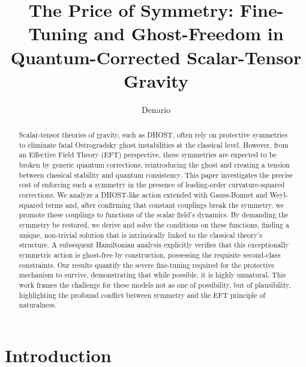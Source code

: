 \documentclass[twocolumn]{aastex631}
\begin{document}
\title{The Price of Symmetry: Fine-Tuning and Ghost-Freedom in Quantum-Corrected Scalar-Tensor Gravity}

\author{Denario}

\begin{abstract}
Scalar-tensor theories of gravity, such as DHOST, often rely on protective symmetries to eliminate fatal Ostrogradsky ghost instabilities at the classical level. However, from an Effective Field Theory (EFT) perspective, these symmetries are expected to be broken by generic quantum corrections, reintroducing the ghost and creating a tension between classical stability and quantum consistency. This paper investigates the precise cost of enforcing such a symmetry in the presence of leading-order curvature-squared corrections. We analyze a DHOST-like action extended with Gauss-Bonnet and Weyl-squared terms and, after confirming that constant couplings break the symmetry, we promote these couplings to functions of the scalar field's dynamics. By demanding the symmetry be restored, we derive and solve the conditions on these functions, finding a unique, non-trivial solution that is intrinsically linked to the classical theory's structure. A subsequent Hamiltonian analysis explicitly verifies that this exceptionally symmetric action is ghost-free by construction, possessing the requisite second-class constraints. Our results quantify the severe fine-tuning required for the protective mechanism to survive, demonstrating that while possible, it is highly unnatural. This work frames the challenge for these models not as one of possibility, but of plausibility, highlighting the profound conflict between symmetry and the EFT principle of naturalness.
\end{abstract}



\section{Introduction}
\label{sec:intro}
\end{document}
